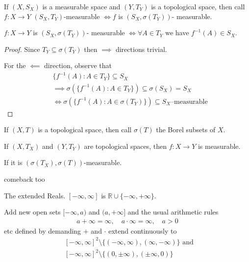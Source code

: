 \begin{abuse}
If $(X, S_X)$ is a measurable space and  $(Y, T_Y)$ is a topological space, then call $f : X \to Y$
$(S_X, T_Y)$-measurable $\iff f$ is $(S_X, \sigma(T_Y))$- measurable.
\end{abuse}

\begin{theorem}
	$f : X \to Y$ is $(S_X, \sigma(T_Y))$- measurable $\iff \forall A \in T_Y$ we have $f^{-1}(A) \in S_X$.
\end{theorem}

\begin{proof}
	Since $T_Y \subseteq \sigma(T_Y)$
	then $\implies$ directions trivial.

	For the $\impliedby$ direction, observe that
	\begin{align*}
		&\{f^{-1}(A) : A \in T_Y\} \subseteq S_X \\
		&\implies \sigma(\{f^{-1}(A) : A \in T_Y\}) \subseteq \sigma(S_X) = S_X \\
		&\iff \sigma(\{f^{-1}(A) : A \in \sigma(T_Y)\}) \subseteq  S_X \text{--measurable}
	\end{align*}
\end{proof}

If $(X,T)$ is a topological space, then call $\sigma(T)$ the Borel subsets of  $X.$

If $(X, T_X)$ and $(Y,T_Y)$ are topological spaces, then $f:X \to Y$ is measurable.

If it is  $(\sigma(T_X), \sigma(T))$-measurable.

comeback too

\begin{definition}
	The extended Reals.
	$[-\infty,\infty]$ is $\mathbb{R} \cup \{-\infty, +\infty\}$.

	Add new open sets $[-\infty, a)$ and $(a, +\infty]$
	and the usual arithmetic rules
	\begin{align*}
		a + \infty = \infty, \quad a\cdot \infty = \infty, \quad a > 0
	\end{align*} etc defined by demanding $+$ and $\cdot$ extend continuously to
	\begin{align*}
		&[-\infty, \infty]^2 \setminus \{(-\infty, \infty), (\infty, -\infty)\} \text{ and } \\
		&[-\infty, \infty]^2 \setminus \{(0, \pm \infty), (\pm \infty, 0)\}
	\end{align*}
\end{definition}

